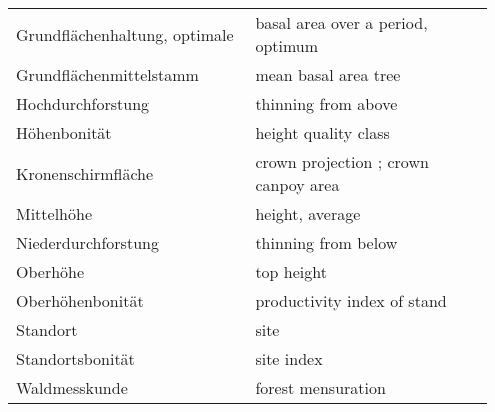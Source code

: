 \begin{singlespace}
{\begin{longtabu}{p{0.475\linewidth} p{0.475\linewidth}}
      Grundflächenhaltung, optimale & basal area over a period, optimum \parencite[p.~229]{Assmann1970} \\
      Grundflächenmittelstamm & mean basal area tree \\
      Hochdurchforstung & thinning from above \\
      Höhenbonität & height quality class \parencite[p.~159]{Assmann1970} \\
      Kronenschirmfläche & crown projection \parencite[p.~157]{Assmann1970}; crown canpoy area \parencite[p.~158]{Assmann1970} \\
      Mittelhöhe & height, average \\
      Niederdurchforstung & thinning from below \\
      Oberhöhe & top height \\
      Oberhöhenbonität & productivity index of stand \\
      Standort & site \\
      Standortsbonität & site index \\
      Waldmesskunde & forest mensuration \\
    \end{longtabu}
  }
\end{singlespace}

